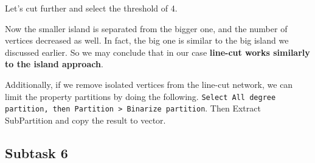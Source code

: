 \FloatBarrier

Let’s cut further and select the threshold of 4.

\FloatBarrier

Now the smaller island is separated from the bigger one, and the number of vertices decreased as well. In fact, the big one is similar to the big island we discussed earlier. So we may conclude that in our case \textbf{line-cut works similarly to the island approach}.

Additionally, if we remove isolated vertices from the line-cut network, we can limit the property partitions by doing the following. \texttt{Select All degree partition, then Partition > Binarize partition}. Then Extract SubPartition and copy the result to vector.


\clearpage


\subsection{Subtask 6}
